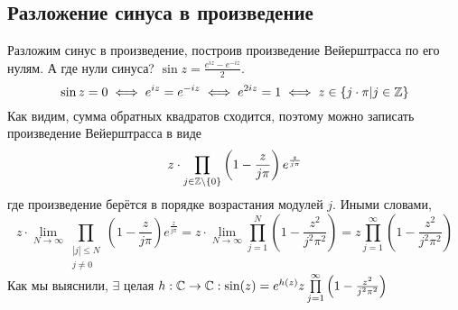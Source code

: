 \documentclass[a4paper]{report}
\begin{document}
    \subsection{Разложение синуса в произведение}
    Разложим синус в произведение, построив произведение Вейерштрасса по его нулям.
    А где нули синуса?
    $\sin z = \frac{e^{iz} - e^{-iz}}{2}$.
    \[\sin z = 0 \iff e^{iz} = e^{-iz} \iff e^{2iz} = 1 \iff z \in \left\{j \cdot \pi\middle|j \in \mathbb{Z}\right\}\]
    Как видим, сумма обратных квадратов сходится, поэтому можно записать произведение Вейерштрасса в виде
    \[z\cdot\prod\limits_{j \in \mathbb{Z} \setminus \{0\}}\left(1 - \frac{z}{j \pi}\right)e^{\frac{z}{j\pi}}\]
    где произведение берётся в порядке возрастания модулей $j$.
    Иными словами, \[z \cdot \lim\limits_{N \to \infty}\prod\limits_{\substack{|j| \le N \\ j \ne 0}}\left(1 - \frac{z}{j \pi}\right)e^{\frac{z}{j\pi}} = z \cdot \lim\limits_{N \to \infty}\prod\limits_{j = 1}^{N}\left(1 - \frac{z^2}{j^2 \pi^2}\right) = z \prod\limits_{j = 1}^{\infty}\left(1 - \frac{z^2}{j^2 \pi^2}\right)\]
    Как мы выяснили, $\exists$ целая $h: \mathbb{C} \rightarrow \mathbb{C}: \sin(z) = e^{h(z)} z \prod\limits_{j = 1}^{\infty}\left(1 - \frac{z^2}{j^2 \pi^2}\right)$
\end{document}
